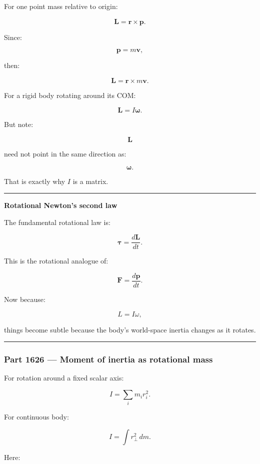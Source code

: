 For one point mass relative to origin:

\[
\boxed{
\mathbf{L}
=
\mathbf{r}\times\mathbf{p}.
}
\]

Since:

\[
\mathbf{p}=m\mathbf{v},
\]

then:

\[
\mathbf{L}
=
\mathbf{r}\times
m\mathbf{v}.
\]

For a rigid body rotating around its COM:

\[
\boxed{
\mathbf{L}
=
I\boldsymbol{\omega}.
}
\]

But note:

\[
\mathbf{L}
\]

need not point in the same direction as:

\[
\boldsymbol{\omega}.
\]

That is exactly why \(I\) is a matrix.

\begin{center}\rule{0.5\linewidth}{0.5pt}\end{center}

\textbf{Rotational Newton's second law}

The fundamental rotational law is:

\[
\boxed{
\boldsymbol{\tau}
=
\frac{d\mathbf{L}}{dt}.
}
\]

This is the rotational analogue of:

\[
\mathbf{F}
=
\frac{d\mathbf{p}}{dt}.
\]

Now because:

\[
L=I\omega,
\]

things become subtle because the body's world-space inertia changes as it rotates.

\begin{center}\rule{0.5\linewidth}{0.5pt}\end{center}

\subsubsection{Part 1626 --- Moment of inertia as rotational mass}\label{part-1626-moment-of-inertia-as-rotational-mass}

For rotation around a fixed scalar axis:

\[
\boxed{
I
=
\sum_i
m_ir_i^2.
}
\]

For continuous body:

\[
\boxed{
I
=
\int
r_\perp^2\,dm.
}
\]

Here:


